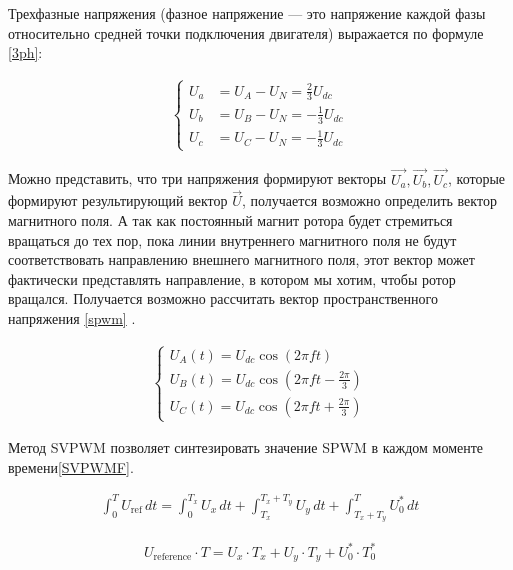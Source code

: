 Трехфазные напряжения (фазное напряжение — это напряжение каждой фазы относительно средней точки подключения двигателя)  выражается по формуле \ref{3ph}:
\begin{ceqn}
	\begin{align} \label{3ph}
		\begin{cases}
			U_a & = U_A - U_N = \frac{2}{3} U_{dc}  \\
			U_b & = U_B - U_N = -\frac{1}{3} U_{dc} \\
			U_c & = U_C - U_N = -\frac{1}{3} U_{dc}
		\end{cases}
	\end{align}
\end{ceqn}
Можно представить, что три напряжения формируют векторы $\vec{U_a}, \vec{U_b}, \vec{U_c}$, которые формируют результирующий вектор $\vec{U}$, получается возможно определить вектор магнитного поля. А так как постоянный магнит ротора будет стремиться вращаться до тех пор, пока линии внутреннего магнитного поля не будут соответствовать направлению внешнего магнитного поля, этот вектор может фактически представлять направление, в котором мы хотим, чтобы ротор вращался. Получается возможно рассчитать вектор пространственного напряжения \ref{spwm} \citep{youtuFieldOriented}.


\begin{ceqn}
	\begin{align} \label{spwm}
		\begin{cases}
			U_A(t) = U_{dc}\cos(2\pi ft)                             \\
			U_B(t) = U_{dc}\cos\left(2\pi ft - \frac{2\pi}{3}\right) \\
			U_C(t) = U_{dc}\cos\left(2\pi ft + \frac{2\pi}{3}\right)
		\end{cases}
	\end{align}
\end{ceqn}


Метод SVPWM позволяет синтезировать значение SPWM в каждом моменте времени\ref{SVPWMF}.
\begin{ceqn}
	\begin{align} \label{SVPWMF}
		\int_0^T U_{\text{ref}} \, dt = \int_0^{T_x} U_x \, dt + \int_{T_x}^{T_x+T_y} U_y \, dt + \int_{T_x+T_y}^T U^*_0 \, dt
	\end{align}
\end{ceqn}

\begin{ceqn}
	\begin{align} \label{SVPWM}
		U_{\text{reference}} \cdot T = U_x \cdot T_x + U_y \cdot T_y + U_0^* \cdot T_0^*
	\end{align}
\end{ceqn}

